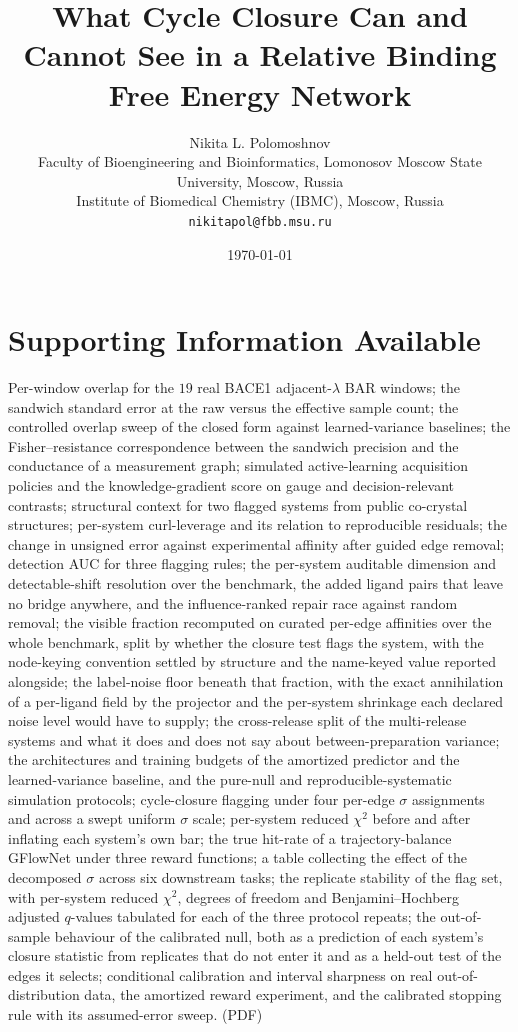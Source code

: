 \documentclass[11pt]{article}
\title{\bf What Cycle Closure Can and Cannot See in a Relative Binding Free Energy Network}
\author{Nikita L. Polomoshnov\\
\small Faculty of Bioengineering and Bioinformatics, Lomonosov Moscow State University, Moscow, Russia\\
\small Institute of Biomedical Chemistry (IBMC), Moscow, Russia\\
\small \texttt{nikitapol@fbb.msu.ru}}
\date{\today}
\theoremstyle{plain}
\theoremstyle{remark}
\begin{document}
\maketitle


\section*{Supporting Information Available}
Per-window overlap for the $19$ real BACE1 adjacent-$\lambda$ BAR windows; the sandwich standard
error at the raw versus the effective sample count; the controlled overlap sweep of the closed form
against learned-variance baselines; the Fisher--resistance correspondence between the sandwich
precision and the conductance of a measurement graph; simulated active-learning acquisition policies and the
knowledge-gradient score on gauge and decision-relevant contrasts; structural context for two flagged systems from
public co-crystal structures; per-system curl-leverage and its relation to reproducible
residuals; the change in unsigned error against experimental affinity after guided edge removal;
detection AUC for three flagging rules; the per-system auditable dimension and detectable-shift resolution over the
benchmark, the added ligand pairs that leave no bridge anywhere, and the influence-ranked repair
race against random removal; the visible fraction recomputed on curated per-edge affinities over
the whole benchmark, split by whether the closure test flags the system, with the node-keying
convention settled by structure and the name-keyed value reported alongside; the label-noise floor beneath that fraction, with the
exact annihilation of a per-ligand field by the projector and the per-system shrinkage each
declared noise level would have to supply; the cross-release split of the multi-release systems and
what it does and does not say about between-preparation variance; the architectures and
training budgets of the amortized predictor and the learned-variance baseline, and the pure-null and
reproducible-systematic simulation protocols;
cycle-closure flagging under four per-edge $\sigma$
assignments and across a swept uniform $\sigma$ scale; per-system reduced $\chi^2$ before and
after inflating each system's own bar; the true hit-rate of a trajectory-balance GFlowNet under
three reward functions; a table collecting the effect of the decomposed $\sigma$ across six
downstream tasks; the replicate stability of the flag set, with per-system reduced $\chi^2$,
degrees of freedom and Benjamini--Hochberg adjusted $q$-values tabulated for each of the three
protocol repeats; the out-of-sample behaviour of the calibrated null, both as a prediction of each
system's closure statistic from replicates that do not enter it and as a held-out test of the
edges it selects; conditional calibration and interval sharpness on real out-of-distribution data,
the amortized reward experiment, and the calibrated stopping rule with its assumed-error sweep.
(PDF)
\end{document}
